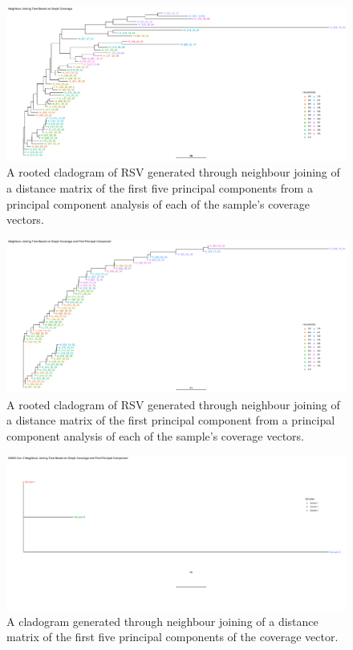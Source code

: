 \documentclass[10pt, a4paper]{article}
\begin{document}
\begin{landscape}
\begin{figure}
\centering
\includegraphics[width=.9\linewidth]{../Figures/RSV/HH20_all_principal_components_nj_tree.png}
\caption[RSV PC1 cladogram]{\label{fig:org42bb2f7}
A rooted cladogram of RSV generated through neighbour joining of a distance matrix of the first five principal components from a principal component analysis of each of the sample’s coverage vectors.}
\end{figure}



\begin{figure}
\centering
\includegraphics[width=.9\linewidth]{../Figures/RSV/HH20_first_principal_component_nj_tree.png}
\caption[RSV PC1 to PC5 cladogram]{\label{fig:orge63c50d}
A rooted cladogram of RSV generated through neighbour joining of a distance matrix of the first principal component from a principal component analysis of each of the sample’s coverage vectors.}
\end{figure}
\end{landscape}

\begin{landscape}
\begin{figure}
\centering
\includegraphics[width=.9\linewidth]{../Figures/SARS_CoV_2/SARS_CoV_2_first_principal_component_nj_tree.png}
\caption[SARS-CoV-2 PC1 cladogram]{\label{fig:org2131973}
A cladogram generated through neighbour joining  of a distance matrix of the first five  principal components of the coverage vector.}
\end{figure}
\end{landscape}
\end{document}
